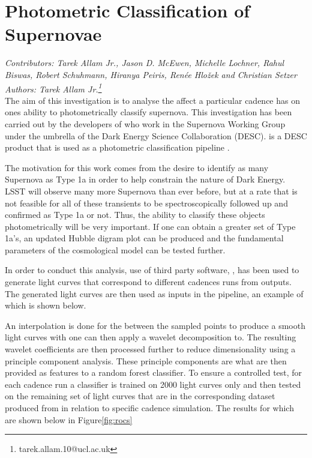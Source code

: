 \usepackage{graphicx}
\usepackage{subcaption}
\usepackage{float}

\section{Photometric Classification of Supernovae}
\textit{Contributors: Tarek Allam Jr., Jason D. McEwen, Michelle Lochner, Rahul
Biswas, Robert Schuhmann, Hiranya Peiris, Ren\'ee Hlo\v{z}ek and Christian Setzer} \\
\textit{Authors: Tarek Allam Jr.\footnote{tarek.allam.10@ucl.ac.uk}} \\

The aim of this investigation is to analyse the affect a particular cadence has
on ones ability to photometrically classify supernova. This investigation has been carried out by the
developers of  who work in the Supernova Working Group under the umbrella of the Dark Energy Science
Collaboration (DESC).  is a DESC product that is used as a photometric
classification pipeline \cite{lochner2016photometric}.

The motivation for this work comes from the desire to identify as many Supernova
as Type 1a in order to help constrain the nature of Dark Energy.
LSST will observe many more Supernova than ever before, but at a rate that is
not feasible for all of these transients to be spectroscopically followed up and
confirmed as Type 1a or not.
Thus, the ability to classify these objects photometrically will be very
important. If one can obtain a greater set of Type 1a's, an updated Hubble
digram plot can be produced and the fundamental parameters of the cosmological
model can be tested further.

In order to conduct this analysis, use of third
party software, , has been used to generate light curves that correspond to
different cadences runs from  outputs. The generated light curves are
then used as inputs in the  pipeline, an example of which is
shown below.

An interpolation is done for the between the sampled points to produce a smooth
light curves with one can then apply a wavelet decomposition to. The resulting
wavelet coefficients are then processed further to reduce dimensionality using a
principle component analysis. These principle components are what are then
provided as features to a random forest classifier. To ensure a controlled test,
for each cadence run a classifier is trained on 2000 light
curves only and then tested on the remaining set of light curves that are in the
corresponding dataset produced from  in relation to specific  cadence
simulation. The results for which are shown below in Figure\ref{fig:rocs}

